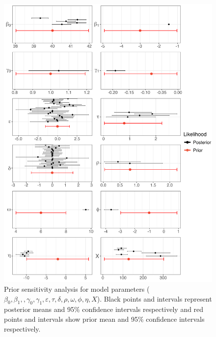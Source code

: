 \documentclass{article}
\begin{document}
\clearpage
\begin{figure}[tbhp] 
\centering
\includegraphics[width=15.5cm]{Plots/Diagnostic_Fig_2.jpg}  
\caption{Prior sensitivity analysis for model parameters ($\beta_0, \beta_1,, 
\gamma_0,\gamma_1,\varepsilon,\tau,\delta,\rho,\omega,\phi,\eta,X$). Black points and intervals represent posterior means and 95\% confidence intervals respectively and red points and intervals show prior mean and 95\% confidence intervals respectively.}
\label{fig:prior_sens}
\end{figure}


\end{document}

